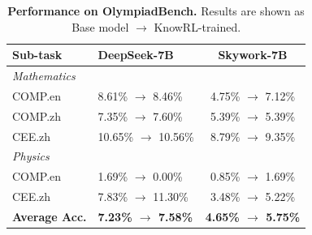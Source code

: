 

\begin{table}[t]
    \centering
    \small
    \begin{tabular}{llc}
    \toprule
    \textbf{Sub-task} & \textbf{DeepSeek-7B} & \textbf{Skywork-7B} \\
    \midrule
    \multicolumn{3}{l}{\textit{Mathematics}} \\
    \quad COMP.en   & 8.61\% $\rightarrow$ 8.46\%  & 4.75\% $\rightarrow$ 7.12\% \\
    \quad COMP.zh   & 7.35\% $\rightarrow$ 7.60\%  & 5.39\% $\rightarrow$ 5.39\% \\
    \quad CEE.zh    & 10.65\% $\rightarrow$ 10.56\% & 8.79\% $\rightarrow$ 9.35\% \\
    \midrule
    \multicolumn{3}{l}{\textit{Physics}} \\
    \quad COMP.en   & 1.69\% $\rightarrow$ 0.00\%  & 0.85\% $\rightarrow$ 1.69\% \\
    \quad CEE.zh    & 7.83\% $\rightarrow$ 11.30\% & 3.48\% $\rightarrow$ 5.22\% \\
    \midrule
    \textbf{Average Acc.}  & \textbf{7.23\% $\rightarrow$ 7.58\%} & \textbf{4.65\% $\rightarrow$ 5.75\%} \\
    \bottomrule
    \end{tabular}
    \caption{\textbf{Performance on OlympiadBench.} Results are shown as Base model $\rightarrow$ KnowRL-trained.}
    \vspace{-3ex}
    \label{tab:olympiadbench_optimized_concise}
\end{table}






